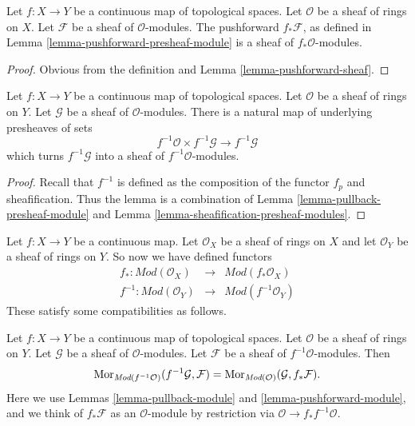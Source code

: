 \begin{lemma}
\label{lemma-pushforward-module}
Let $f : X \to Y$ be a continuous map of topological spaces.
Let $\mathcal{O}$ be a sheaf of rings on $X$. Let
$\mathcal{F}$ be a sheaf of $\mathcal{O}$-modules.
The pushforward $f_*\mathcal{F}$, as defined in
Lemma \ref{lemma-pushforward-presheaf-module}
is a sheaf of $f_*\mathcal{O}$-modules.
\end{lemma}

\begin{proof}
Obvious from the definition and Lemma \ref{lemma-pushforward-sheaf}.
\end{proof}

\begin{lemma}
\label{lemma-pullback-module}
Let $f : X \to Y$ be a continuous map of topological spaces.
Let $\mathcal{O}$ be a sheaf of rings on $Y$. Let
$\mathcal{G}$ be a sheaf of $\mathcal{O}$-modules.
There is a natural map of underlying presheaves of sets
$$
f^{-1}\mathcal{O} \times f^{-1}\mathcal{G}
\longrightarrow
f^{-1}\mathcal{G}
$$
which turns $f^{-1}\mathcal{G}$ into a
sheaf of $f^{-1}\mathcal{O}$-modules.
\end{lemma}

\begin{proof}
Recall that $f^{-1}$ is defined as the composition of the
functor $f_p$ and sheafification. Thus the lemma
is a combination of Lemma \ref{lemma-pullback-presheaf-module}
and Lemma \ref{lemma-sheafification-presheaf-modules}.
\end{proof}

\noindent
Let $f : X \to Y$ be a continuous map.
Let $\mathcal{O}_X$ be a sheaf of rings on $X$ and
let $\mathcal{O}_Y$ be a sheaf of rings on $Y$.
So now we have defined functors
\begin{eqnarray*}
f_* : \textit{Mod}(\mathcal{O}_X) &
\longrightarrow &
\textit{Mod}(f_*\mathcal{O}_X) \\
f^{-1} : \textit{Mod}(\mathcal{O}_Y) &
\longrightarrow &
\textit{Mod}(f^{-1}\mathcal{O}_Y)
\end{eqnarray*}
These satisfy some compatibilities as follows.

\begin{lemma}
\label{lemma-adjoint-push-pull-modules}
Let $f : X \to Y$ be a continuous map of topological spaces.
Let $\mathcal{O}$ be a sheaf of rings on $Y$.
Let $\mathcal{G}$ be a sheaf of $\mathcal{O}$-modules.
Let $\mathcal{F}$ be a sheaf of $f^{-1}\mathcal{O}$-modules.
Then
$$
\mathop{\mathrm{Mor}}\nolimits_{\textit{Mod}(f^{-1}\mathcal{O})}(f^{-1}\mathcal{G}, \mathcal{F})
=
\mathop{\mathrm{Mor}}\nolimits_{\textit{Mod}(\mathcal{O})}(\mathcal{G}, f_*\mathcal{F}).
$$
Here we use
Lemmas \ref{lemma-pullback-module}
and \ref{lemma-pushforward-module}, and we think of
$f_*\mathcal{F}$ as an $\mathcal{O}$-module by restriction via
$\mathcal{O} \to f_*f^{-1}\mathcal{O}$.
\end{lemma}

